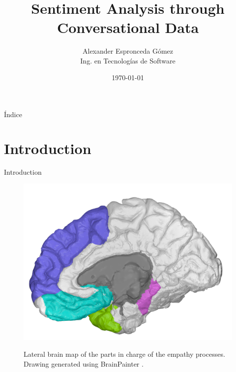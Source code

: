 \documentclass[11pt]{beamer}
\begin{document}
 
\title[Defensa de Tesis  \hspace{35mm} \insertframenumber/\inserttotalframenumber]{Sentiment Analysis through Conversational Data}
\author{Alexander Espronceda Gómez \\ Ing. en Tecnologías de Software}
\date{\today}


\frame{\titlepage}

\begin{frame}{Índice}
\transdissolve
\begin{center}
\begin{multicols}{2}
  \footnotesize{\tableofcontents}	
\end{multicols}
\end{center}
\end{frame}

\section{Introduction}

\begin{frame}{Introduction}
  \begin{figure}[!h]
	\centering
	\includegraphics[scale=0.15]{BrainMap}
	\label{fig:brainmap}
	\caption{Lateral brain map of the parts in charge of the empathy processes. Drawing generated using BrainPainter \citep{img1}.}
	\end{figure}
\end{frame}
\end{document}
